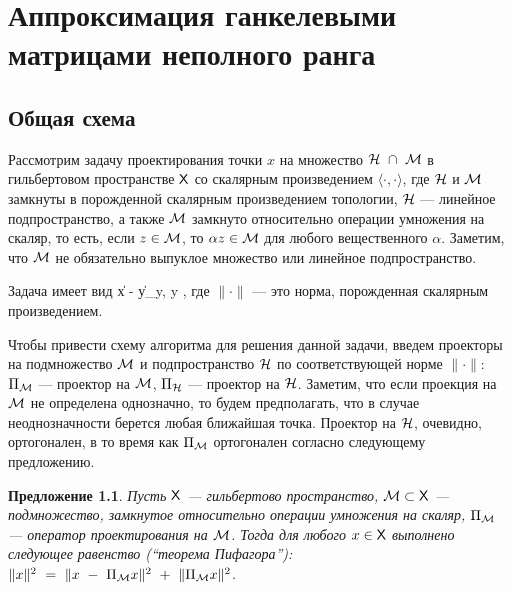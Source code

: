 \documentclass[12pt, specialist, subf,href,colorlinks=true,substylefile = spbu.rtx]{disser}
\newtheorem{proposition}{Предложение}
\theoremstyle{remark}
\theoremstyle{definition}
\begin{document}
\chapter{Аппроксимация ганкелевыми матрицами неполного ранга}
\label{sec:lowrank_appr}
\section{Общая схема}
Рассмотрим задачу проектирования точки $x$ на множество $\mathcal{H}~ \cap~\mathcal{M}$ в гильбертовом пространстве $\mathsf{X}$ со скалярным произведением $\langle \cdot, \cdot \rangle$, где $\mathcal{H}$ и $\mathcal{M}$ замкнуты в порожденной скалярным произведением топологии, $\mathcal{H}$ --- линейное подпространство, а также $\mathcal{M}$ замкнуто относительно операции умножения на скаляр, то есть, если $z \in \mathcal{M}$, то $\alpha z\in \mathcal{M}$ для любого вещественного $\alpha$. Заметим, что $\mathcal{M}$ не обязательно выпуклое множество или линейное подпространство.

Задача имеет вид
\be
\label{eq:gen_task}
\|x - y\| \to \min_y, \quad y \in \calH \cap \calM,
\ee
где $\|\cdot\|$ --- это норма, порожденная скалярным произведением.

Чтобы привести схему алгоритма для решения данной задачи, введем проекторы на подмножество $\mathcal{M}$ и подпространство $\mathcal{H}$ по соответствующей норме $\|\cdot\|$: $\Pi_{\mathcal{M}}$ --- проектор на $\mathcal{M}$,
$\Pi_{\mathcal{H}}$ --- проектор на $\mathcal{H}$.
Заметим, что если проекция на $\mathcal{M}$ не определена однозначно, 
то будем предполагать, что в случае неоднозначности берется любая ближайшая точка.
Проектор на $\mathcal{H}$, очевидно, ортогонален, в то время как $\Pi_{\mathcal{M}}$ ортогонален согласно следующему предложению.

\begin{proposition} \label{prop:pythaprop}
	Пусть $\mathsf{X}$ --- гильбертово пространство, $\mathcal{M} \subset \mathsf{X}$ --- подмножество, замкнутое относительно операции умножения на скаляр, $\Pi_{\mathcal{M}}$ --- оператор проектирования на $\mathcal{M}$. Тогда для любого $x \in \mathsf{X}$ выполнено следующее равенство (``теорема Пифагора''): $\|x\|^2~=~\|x~-~\Pi_{\mathcal{M}} x\|^2~+~\|\Pi_{\mathcal{M}} x\|^2$.
\end{proposition}
\end{document}
